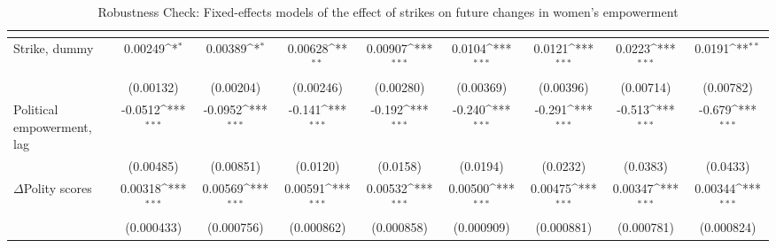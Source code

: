 \begin{table}[htbp]\centering
\def\sym#1{\ifmmode^{#1}\else\(^{#1}\)\fi}
\caption{Robustness Check: Fixed-effects models of the effect of strikes on future changes in women's empowerment \label{fepolemstriksnowar}}
\begin{tabular}{l*{8}{c}}
\hline\hline
                    &&&&&&&&\\
\hline
Strike, dummy          &     0.00249\sym{*}  &     0.00389\sym{*}  &     0.00628\sym{**} &     0.00907\sym{***}&      0.0104\sym{***}&      0.0121\sym{***}&      0.0223\sym{***}&      0.0191\sym{**} \\
                    &   (0.00132)         &   (0.00204)         &   (0.00246)         &   (0.00280)         &   (0.00369)         &   (0.00396)         &   (0.00714)         &   (0.00782)         \\
[1em]
Political empowerment, lag  &     -0.0512\sym{***}&     -0.0952\sym{***}&      -0.141\sym{***}&      -0.192\sym{***}&      -0.240\sym{***}&      -0.291\sym{***}&      -0.513\sym{***}&      -0.679\sym{***}\\
                    &   (0.00485)         &   (0.00851)         &    (0.0120)         &    (0.0158)         &    (0.0194)         &    (0.0232)         &    (0.0383)         &    (0.0433)         \\
[1em]
$\Delta$Polity scores         &     0.00318\sym{***}&     0.00569\sym{***}&     0.00591\sym{***}&     0.00532\sym{***}&     0.00500\sym{***}&     0.00475\sym{***}&     0.00347\sym{***}&     0.00344\sym{***}\\
                    &  (0.000433)         &  (0.000756)         &  (0.000862)         &  (0.000858)         &  (0.000909)         &  (0.000881)         &  (0.000781)         &  (0.000824)         \\

\end{tabular}
\end{table}
